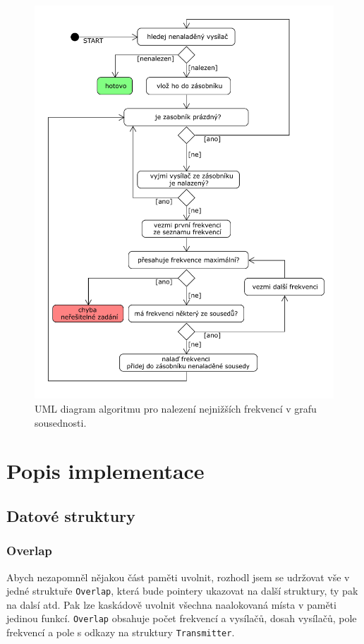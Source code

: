 \documentclass[12pt,a4paper]{article}
\begin{document}
\begin{figure}[htbp]
  \centering
    \includegraphics[width=.90\textwidth]{pics/uml.pdf}
  \caption{UML diagram algoritmu pro nalezení nejnižších frekvencí v grafu sousednosti.}
  \label{fig:uml}
\end{figure}
%
\section{Popis implementace}
\subsection {Datové struktury}
\subsubsection {Overlap}
%
Abych nezapomněl nějakou část paměti uvolnit, rozhodl jsem se udržovat vše v jedné struktuře \texttt{Overlap}, 
která bude pointery ukazovat na další struktury, ty pak na dalsí atd. Pak lze kaskádově uvolnit 
všechna naalokovaná místa v paměti jedinou funkcí. \texttt{Overlap} obsahuje počet frekvencí a vysílačů,
dosah vysílačů, pole frekvencí a pole s odkazy na struktury \texttt{Transmitter}.
\end{document}
